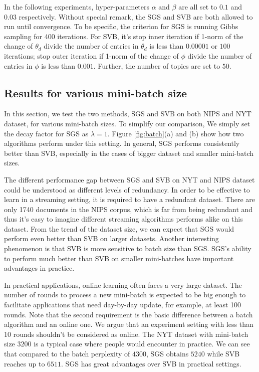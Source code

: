 \documentclass{article} %
\begin{document}
\label{sec:exp_setting}
In the following experiments, hyper-parameters $\alpha$ and $\beta$ are all set to $0.1$ and $0.03$ respectively. Without special remark, the SGS and SVB are both allowed to run until convergence. To be specific, the criterion for SGS is running Gibbs sampling for 400 iterations. For SVB, it's stop inner iteration if 1-norm of the change of $\theta_d$ divide the number of entries in $\theta_d$ is less than $0.00001$ or $100$ iterations; stop outer iteration if 1-norm of the change of $\phi$ divide the number of entries in $\phi$ is less than $0.001$. Further, the number of topics are set to $50$. 

\subsection{Results for various mini-batch size}
In this section, we test the two methods, SGS and SVB on both NIPS and NYT dataset, for various mini-batch sizes. To simplify our comparison, We simply set the decay factor for SGS as $\lambda=1$. Figure \ref{fig:batch}(a) and (b) show how two algorithms perform under this setting. In general, SGS performs consistently better than SVB, especially in the cases of bigger dataset and smaller mini-batch sizes. 

The different performance gap between SGS and SVB on NYT and NIPS dataset could be understood as different levels of redundancy. In order to be effective to learn in a streaming setting, it is required to have a redundant dataset. There are only 1740 documents in the NIPS corpus, which is far from being redundant and thus it's easy to imagine different streaming algorithms performs alike on this dataset. From the trend of the dataset size, we can expect that SGS would perform even better than SVB on larger datasets. Another interesting phenomenon is that SVB is more sensitive to batch size than SGS. SGS's ability to perform much better than SVB on smaller mini-batches have important advantages in practice.

In practical applications, online learning often faces a very large dataset. The number of rounds to process a new mini-batch is expected to be big enough to facilitate applications that need day-by-day update, for example, at least 100 rounds. Note that the second requirement is the basic difference between a batch algorithm and an online one. We argue that an experiment setting with less than 10 rounds shouldn't be considered as online. The NYT dataset with mini-batch size $3200$ is a typical case where people would encounter in practice. We can see that compared to the batch perplexity of $4300$, SGS obtains $5240$ while SVB reaches up to $6511$. SGS has great advantages over SVB in practical settings.
\end{document}

